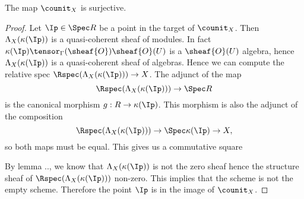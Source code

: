 \begin{lemma}
The map $\counit_X$ is surjective.
\end{lemma}
\begin{proof}
Let $\Ip\in \Spec R$ be a point in the target of $\counit_X$.
Then $\Lambda_X(\kappa(\Ip))$ is a quasi-coherent sheaf of modules.
In fact $\kappa(\Ip)\tensor_\Gamma(\sheaf{O}) \sheaf{O}(U)$ is a $\sheaf{O}(U)$ algebra, hence $\Lambda_X(\kappa(\Ip))$ is a quasi-coherent sheaf of algebras.
Hence we can compute the relative spec $\Rspec(\Lambda_X(\kappa(\Ip)))\rightarrow X$. The adjunct of the map
\[\Rspec(\Lambda_X(\kappa(\Ip)))\rightarrow \Spec R\] is the canonical morphism $g:R\rightarrow \kappa(\Ip)$. 
This morphism is also the adjunct of the composition
\[\Rspec(\Lambda_X(\kappa(\Ip)))\rightarrow \Spec \kappa(\Ip)\rightarrow X,\]
so both maps must be equal. This gives us a commutative square

\begin{center}
\end{center}

By lemma .., we know that $\Lambda_X(\kappa(\Ip))$ is not the zero sheaf hence the structure sheaf of $\Rspec(\Lambda_X(\kappa(\Ip)))$ non-zero.
This implies that the scheme is not the empty scheme. Therefore the point $\Ip$ is in the image of $\counit_X$.
\end{proof}
